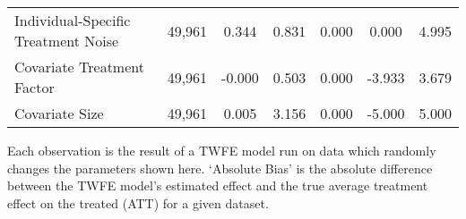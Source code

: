 \begin{table}[htbp]
\begin{tabular}{l*{1}{cccccc}}
Individual-Specific Treatment Noise&      49,961&       0.344&       0.831&       0.000&       0.000&       4.995\\
Covariate Treatment Factor&      49,961&      -0.000&       0.503&       0.000&      -3.933&       3.679\\
Covariate Size      &      49,961&       0.005&       3.156&       0.000&      -5.000&       5.000\\
\hline\hline
\end{tabular}
\footnotesize  
\vspace{5mm}
    \footnotesize \begin{singlespace*}
        Each observation is the result of a TWFE model run on data which randomly changes the parameters shown here. `Absolute Bias' is the absolute difference between the TWFE model's estimated effect and the true average treatment effect on the treated (ATT) for a given dataset.
    \end{singlespace*}
\end{table}
